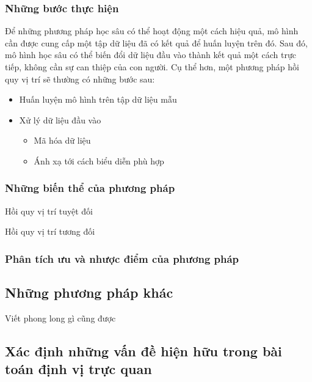 \subsubsection*{Những bước thực hiện}

Để những phương pháp học sâu có thể hoạt động một cách hiệu quả, mô hình cần được cung cấp một tập dữ liệu đã có kết quả để huấn luyện trên đó. Sau đó, mô hình học sâu có thể biến đổi dữ liệu đầu vào thành kết quả một cách trực tiếp, không cần sự can thiệp của con người. Cụ thể hơn, một phương pháp hồi quy vị trí sẽ thường có những bước sau:
\begin{itemize}
    \item Huấn luyện mô hình trên tập dữ liệu mẫu
    \item Xử lý dữ liệu đầu vào
    \begin{itemize}
        \item Mã hóa dữ liệu
        \item Ánh xạ tới cách biểu diễn phù hợp
    \end{itemize}
\end{itemize}
\subsubsection*{Những biến thể của phương pháp}

Hồi quy vị trí tuyệt đối

Hồi quy vị trí tương đối
\subsubsection*{Phân tích ưu và nhược điểm của phương pháp}

\subsection{Những phương pháp khác}
Viết phong long gì cũng được
\subsection{Xác định những vấn đề hiện hữu trong bài toán định vị trực quan}

